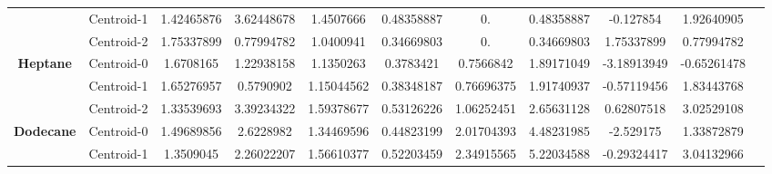 \documentclass[preprint,12pt]{elsarticle}
\begin{document}
\begin{table}[H]
\begin{tabular}{ccccccccccc}
				  			\multicolumn{1}{|c|}{} & \multicolumn{1}{c|}{Centroid-1} & \multicolumn{1}{c|}{1.42465876} & \multicolumn{1}{c|}{3.62448678} & \multicolumn{1}{c|}{1.4507666} & \multicolumn{1}{c|}{0.48358887} & \multicolumn{1}{c|}{0.} & \multicolumn{1}{c|}{0.48358887} & \multicolumn{1}{c|}{-0.127854} & \multicolumn{1}{c|}{1.92640905} &  \\ \cline{2-10}
				  			\multicolumn{1}{|c|}{} & \multicolumn{1}{c|}{Centroid-2} & \multicolumn{1}{c|}{1.75337899} & \multicolumn{1}{c|}{0.77994782} & \multicolumn{1}{c|}{1.0400941} & \multicolumn{1}{c|}{0.34669803} & \multicolumn{1}{c|}{0.} & \multicolumn{1}{c|}{0.34669803} & \multicolumn{1}{c|}{1.75337899} & \multicolumn{1}{c|}{0.77994782} &  \\ \cline{1-10}
				  			\multicolumn{1}{|c|}{\multirow{3}{*}{\textbf{Heptane}}} & \multicolumn{1}{c|}{Centroid-0} & \multicolumn{1}{c|}{1.6708165} & \multicolumn{1}{c|}{1.22938158} & \multicolumn{1}{c|}{1.1350263} & \multicolumn{1}{c|}{0.3783421} & \multicolumn{1}{c|}{0.7566842} & \multicolumn{1}{c|}{1.89171049} & \multicolumn{1}{c|}{-3.18913949} & \multicolumn{1}{c|}{-0.65261478} &  \\ \cline{2-10}
				  			\multicolumn{1}{|c|}{} & \multicolumn{1}{c|}{Centroid-1} & \multicolumn{1}{c|}{1.65276957} & \multicolumn{1}{c|}{0.5790902} & \multicolumn{1}{c|}{1.15044562} & \multicolumn{1}{c|}{0.38348187} & \multicolumn{1}{c|}{0.76696375} & \multicolumn{1}{c|}{1.91740937} & \multicolumn{1}{c|}{-0.57119456} & \multicolumn{1}{c|}{1.83443768} &  \\ \cline{2-10}
				  			\multicolumn{1}{|c|}{} & \multicolumn{1}{c|}{Centroid-2} & \multicolumn{1}{c|}{1.33539693} & \multicolumn{1}{c|}{3.39234322} & \multicolumn{1}{c|}{1.59378677} & \multicolumn{1}{c|}{0.53126226} & \multicolumn{1}{c|}{1.06252451} & \multicolumn{1}{c|}{2.65631128} & \multicolumn{1}{c|}{0.62807518} & \multicolumn{1}{c|}{3.02529108} &  \\ \cline{1-10}
				  			\multicolumn{1}{|c|}{\multirow{3}{*}{\textbf{Dodecane}}} & \multicolumn{1}{c|}{Centroid-0} & \multicolumn{1}{c|}{1.49689856} & \multicolumn{1}{c|}{2.6228982} & \multicolumn{1}{c|}{1.34469596} & \multicolumn{1}{c|}{0.44823199} & \multicolumn{1}{c|}{2.01704393} & \multicolumn{1}{c|}{4.48231985} & \multicolumn{1}{c|}{-2.529175} & \multicolumn{1}{c|}{1.33872879} &  \\ \cline{2-10}
				  			\multicolumn{1}{|c|}{} & \multicolumn{1}{c|}{Centroid-1} & \multicolumn{1}{c|}{1.3509045} & \multicolumn{1}{c|}{2.26022207} & \multicolumn{1}{c|}{1.56610377} & \multicolumn{1}{c|}{0.52203459} & \multicolumn{1}{c|}{2.34915565} & \multicolumn{1}{c|}{5.22034588} & \multicolumn{1}{c|}{-0.29324417} & \multicolumn{1}{c|}{3.04132966} &  \\ \cline{2-10}

\end{tabular}
\end{table}
\end{document}
